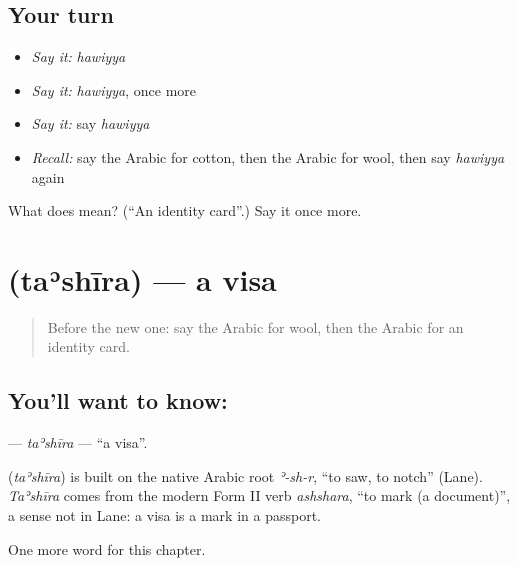 \subsection*{Your turn}
\begin{itemize}
\raggedright
  \item \emph{Say it:} \emph{hawiyya}
  \item \emph{Say it:} \emph{hawiyya}, once more
  \item \emph{Say it:} say \emph{hawiyya}
  \item \emph{Recall:} say the Arabic for cotton, then the Arabic for wool, then say \emph{hawiyya} again
\end{itemize}

\begin{tcolorbox}[breakable,colback=teal!4,colframe=teal!35!black,title={Before you move on}]
What does  mean? (\textquotedblleft{}An identity card\textquotedblright{}.) Say it once more.
\end{tcolorbox}
\section[\texorpdfstring{\ar{تأشيرة} (taʾshīra)}{تأشيرة (taʾshīra)}]{ (taʾshīra) — a visa}

\label{lesson:AR-C215-tashira}



\begin{quote}
Before the new one: say the Arabic for wool, then the Arabic for an identity card.
\end{quote}

\subsection*{You'll want to know: }
\textbf{} — \emph{taʾshīra} — \textquotedblleft{}a visa\textquotedblright{}.

\begin{cousinweb}
\textbf{} (\emph{taʾshīra}) is built on the native Arabic root \emph{ʾ-sh-r}, \textquotedblleft{}to saw, to notch\textquotedblright{} (Lane). \emph{Taʾshīra} comes from the modern Form II verb \emph{ashshara}, \textquotedblleft{}to mark (a document)\textquotedblright{}, a sense not in Lane: a visa is a mark in a passport.
\end{cousinweb}

\begin{grammarlens}[title={What you've built}]
One more word for this chapter.
\end{grammarlens}

